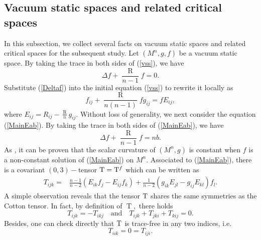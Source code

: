 \documentclass[10pt,leqno,oneside]{amsart}
\begin{document}
{    \subsection{Vacuum static spaces and related critical spaces}
              In this subsection, we collect several facts on vacuum static spaces and related critical spaces for the subsequent study. Let $(M^n, g, f)$ be a vacuum static space. By taking the trace in both sides of (\ref{vss}), we have
         \begin{equation}\label{Deltaf}
         \Delta f+\frac{\operatorname R}{n-1}f=0.
         \end{equation}
              Substitute (\ref{Deltaf}) into the initial equation (\ref{vss}) to rewrite it locally as
         \begin{equation}\label{MainEVSS}f_{ij}+\frac{\operatorname R}{n(n-1)}fg_{ij}=fE_{ij},\end{equation}
              where $E_{ij}=R_{ij}-\frac{\operatorname R}{n}g_{ij}.$
              Without loss of generality, we next consider the equation (\ref{MainEab}). By taking the trace in both sides of (\ref{MainEab}), we have
         \begin{equation}\label{Deltafab}
               \Delta f+\frac{\operatorname R}{n-1}f=nb.
         \end{equation}
              As \cite[Proposition 2.3]{Cor2000CMP}, it can be proven that the scalar curvature of \((M^n,g)\) is constant when \(f\) is a non-constant solution of (\ref{MainEab}) on \(M^n\).
              Associated to (\ref{MainEab}), there is a covariant $(0,3)-$tensor ${\rm T}={\rm T}^f$ which can be written as
         \begin{equation}\label{T}
                 \begin{aligned}
                        T_{ijk}=&\frac{n-1}{n-2}\left(E_{ik}f_{j}-E_{ij}f_{k}\right)+\frac{1}{n-2}\left(g_{ik}E_{jl}-g_{ij}E_{kl}\right)f_{l}.
            \end{aligned}\end{equation}
               A simple observation reveals that the tensor ${\rm T}$ shares the same symmetries as the Cotton tensor. In fact, by definition of $\operatorname{T},$ there holds
               \begin{equation}\label{Tijk=-Tikj}T_{ijk}=-T_{ikj} \quad \text {and} \quad T_{ijk}+T_{jki}+T_{kij}=0.\end{equation}
               Besides, one can check directly that ${\rm T}$ is trace-free in any two indices, i.e.
                \begin{equation}\label{Tiji=0}T_{iik}=0=T_{iji}.\end{equation}



}
\end{document}
